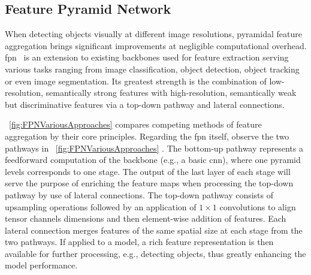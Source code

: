 \subsection{Feature Pyramid Network}
\label{ssec:FeaturePyramidNetwork}

When detecting objects visually at different image resolutions, pyramidal feature aggregation brings significant improvements at negligible computational overhead. \Gls{fpn}~\cite{lin2017fpn} is an extension to existing backbones used for feature extraction serving various tasks ranging from image classification, object detection, object tracking or even image segmentation. Its greatest strength is the combination of low-resolution, semantically strong features with high-resolution, semantically weak but discriminative features via a top-down pathway and lateral connections.

\figstr{}~\ref{fig:FPNVariousApproaches} compares competing methods of feature aggregation by their core principles. Regarding the \gls{fpn} itself, observe the two pathways in \figstr{}~\ref{fig:FPNVariousApproaches} . The bottom-up pathway represents a feedforward computation of the backbone (e.g., a basic \gls{cnn}), where one pyramid levels corresponds to one stage. The output of the last layer of each stage will serve the purpose of enriching the feature maps when processing the top-down pathway by use of lateral connections. The top-down pathway consists of upsampling operations followed by an application of $1 \times 1$ convolutions to align tensor channels dimensions and then element-wise addition of features. Each lateral connection merges features of the same spatial size at each stage from the two pathways. If applied to a model, a rich feature representation is then available for further processing, e.g., detecting objects, thus greatly enhancing the model performance.

